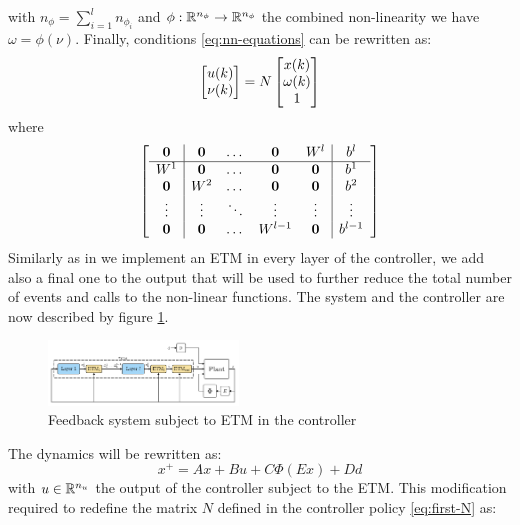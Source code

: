 \documentclass{ifacconf}
\theoremstyle{plain}
\begin{document}
with $n_{\phi} = \sum_{i=1}^{l} n_{\phi_i}$ and $\phi: {\mathbb{R}}^{n_{\phi}} \to {\mathbb{R}}^{n_{\phi}}$ the combined non-linearity we have $\omega = \phi(\nu)$. Finally, conditions \eqref{eq:nn-equations} can be rewritten as:
\begin{equation*}
  \left[\begin{matrix}u(k)\\ \nu(k)\end{matrix}\right] = N \left[\begin{matrix}x(k) \\ \omega(k) \\ 1\end{matrix}\right] 
\end{equation*}
where
\begin{equation}\label{eq:first-N}
  \left[\begin{matrix}
    \begin{array}{c | c c c c | c}
      \operatorname{\mathbf{0}} & \operatorname{\mathbf{0}} & \dots & \operatorname{\mathbf{0}} & W^l & b^l \\ 
      \hline
      W^1 & \operatorname{\mathbf{0}} & \dots & \operatorname{\mathbf{0}} & \operatorname{\mathbf{0}} & b^1 \\
      \operatorname{\mathbf{0}} & W^2 & \dots & \operatorname{\mathbf{0}} & \operatorname{\mathbf{0}} & b^2 \\
      \vdots & \vdots & \ddots & \vdots & \vdots & \vdots \\
      \operatorname{\mathbf{0}} & \operatorname{\mathbf{0}} & \dots & W^{l-1} & \operatorname{\mathbf{0}} & b^{l-1}
    \end{array}
  \end{matrix}\right]
\end{equation}
Similarly as in \cite{css-extended} we implement an ETM in every layer of the controller, we add also a final one to the output that will be used to further reduce the total number of events and calls to the non-linear functions. The system and the controller are now described by figure \ref{fig:second_scheme}.
\begin{figure}[H]
    \centering
    \includegraphics[width=0.45\textwidth]{Figures/second_scheme}
    \centering
    \caption{Feedback system subject to ETM in the controller}
    \label{fig:second_scheme}
\end{figure}
The dynamics will be rewritten as:
\begin{equation}\label{eq:system-dynamics}
  x^{+} = A x + B u + C \Phi(E x) + D d
\end{equation}
with $u \in {\mathbb{R}}^{n_u}$ the output of the controller subject to the ETM. This modification required to redefine the matrix $N$ defined in the controller policy \eqref{eq:first-N} as:
\end{document}
